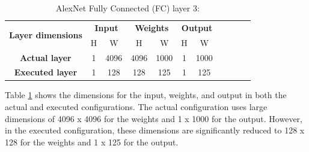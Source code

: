\begin{table}[H]
\centering
\caption{AlexNet Fully Connected (FC) layer 3:}
\label{tab:tileFcDim}
 \begin{tabular}{|c|c|c|c|c|c|c|c|c|c|c|} \hline  
 
 \multirow{2}{*}{\textbf{Layer dimensions}} &  
 \multicolumn{2}{|c|}{\textbf{Input}} &  
 \multicolumn{2}{|c|}{\textbf{Weights}} &  
 \multicolumn{2}{|c|}{\textbf{Output}}\\ \cline{2-7}
 & H &  W &  H &  W & H &  W\\ \hline  
 \textbf{Actual layer} &  1 &  4096 & 4096 & 1000 & 1 & 1000 \\ \hline 
 \textbf{Executed layer} &  1 &  \cellcolor{yellow}128 & \cellcolor{yellow}128 & \cellcolor{yellow}125 & 1 & \cellcolor{yellow}125 \\ \hline 
 \end{tabular}
\end{table}

Table \ref{tab:tileFcDim} shows the dimensions for the input, weights, and output in both the actual and executed configurations. The actual configuration uses large dimensions of 4096 x 4096 for the weights and 1 x 1000 for the output. However, in the executed configuration, these dimensions are significantly reduced to 128 x 128 for the weights and 1 x 125 for the output.

\begin{table}[H]
\centering
\caption{Loop tiling - Sweep 1 (Inner-most loop)}
\label{tab:tileFcSweep1}
\end{table}

